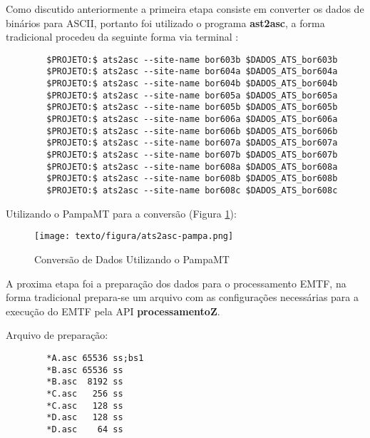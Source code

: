     Como discutido anteriormente a primeira etapa consiste em converter os dados de binários para ASCII, portanto foi utilizado o programa \textbf{ast2asc}, a forma tradicional procedeu da seguinte forma via terminal :
    
    \begin{footnotesize}        
\begin{verbatim}
        $PROJETO:$ ats2asc --site-name bor603b $DADOS_ATS_bor603b
        $PROJETO:$ ats2asc --site-name bor604a $DADOS_ATS_bor604a
        $PROJETO:$ ats2asc --site-name bor604b $DADOS_ATS_bor604b
        $PROJETO:$ ats2asc --site-name bor605a $DADOS_ATS_bor605a
        $PROJETO:$ ats2asc --site-name bor605b $DADOS_ATS_bor605b
        $PROJETO:$ ats2asc --site-name bor606a $DADOS_ATS_bor606a
        $PROJETO:$ ats2asc --site-name bor606b $DADOS_ATS_bor606b
        $PROJETO:$ ats2asc --site-name bor607a $DADOS_ATS_bor607a
        $PROJETO:$ ats2asc --site-name bor607b $DADOS_ATS_bor607b
        $PROJETO:$ ats2asc --site-name bor608a $DADOS_ATS_bor608a
        $PROJETO:$ ats2asc --site-name bor608b $DADOS_ATS_bor608b
        $PROJETO:$ ats2asc --site-name bor608c $DADOS_ATS_bor608c
\end{verbatim}
\end{footnotesize}

    Utilizando o PampaMT para a conversão (Figura \ref{ats2asc-pampa}):
    
    \begin{figure}[H]
        \caption{Conversão de Dados Utilizando o PampaMT}
            \begin{center}
                \texttt{[image: texto/figura/ats2asc-pampa.png]}
            \end{center}
        \legend{\Fonte{\oautor}}
        \label{ats2asc-pampa}
    \end{figure}
    
    A proxima etapa foi a preparação dos dados para o processamento EMTF, na forma tradicional prepara-se um arquivo com as configurações necessárias para a execução do EMTF pela API \textbf{processamentoZ}.
    
    Arquivo de preparação:
    
\begin{footnotesize}        
\begin{verbatim}
        *A.asc 65536 ss;bs1
        *B.asc 65536 ss
        *B.asc  8192 ss
        *C.asc   256 ss
        *C.asc   128 ss
        *D.asc   128 ss
        *D.asc    64 ss
\end{verbatim}
\end{footnotesize}
    
